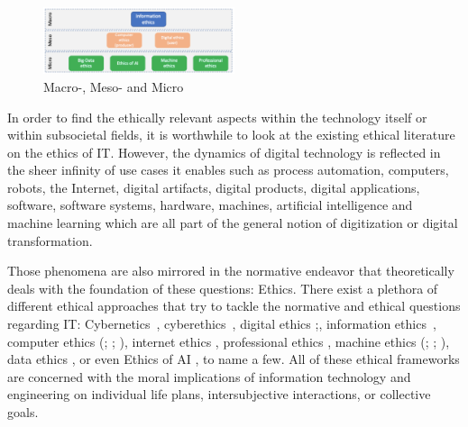\documentclass[manuscript,screen]{acmart}
\begin{document}
\begin{figure}[h!]
  \caption{Macro-, Meso- and Micro
}
  \includegraphics[width=0.5\textwidth]{micro}
\end{figure}

In order to find the ethically relevant aspects within the technology itself or within subsocietal fields, it is worthwhile to look at the existing ethical literature on the ethics of IT. However, the dynamics of digital technology is reflected in the sheer infinity of use cases it enables such as process automation, computers, robots, the Internet, digital artifacts, digital products, digital applications, software, software systems, hardware, machines, artificial intelligence and machine learning which are all part of the general notion of digitization or digital transformation. 

Those phenomena are also mirrored in the normative endeavor that theoretically deals with the foundation of these questions: Ethics. There exist a plethora of different ethical approaches that try to tackle the normative and ethical questions regarding IT: Cybernetics~\cite{wiener1950cybernetics}, cyberethics~\cite{tavani1996cyberethics}, digital ethics \citep{capurro2009digital};\cite{ess2013digital,spiekermann2019digitale}, information ethics~\cite{floridi2013ethics}, computer ethics (\citep{johnson1985computer}; \citep{maner1999computer}; \citep{moor1985computer}), internet ethics \citep{langford2000internet}, professional ethics \citep{bynum2004computer}, machine ethics (\citep{anderson2004towards}; \citep{moor1985computer}; \citep{wallach2008moral}), data ethics  \citep{zwitter2014big}, or even Ethics of AI  \citep{bostrom2014ethics}, to name a few. All of these ethical frameworks are concerned with the moral implications of information technology and engineering on individual life plans, intersubjective interactions, or collective goals. 
\end{document}
